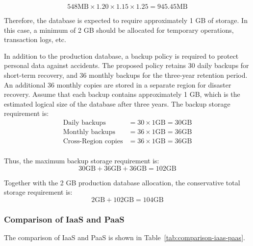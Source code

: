 \[
	548 \text{MB} \times 1.20 \times 1.15 \times 1.25 = 945.45 \text{MB}
\]

Therefore, the database is expected to require approximately 1 GB of storage. In this case, a minimum of 2 GB should be allocated for temporary operations, transaction logs, etc.

In addition to the production database, a backup policy is required to protect personal data against accidents. The proposed policy retains 30 daily backups for short-term recovery, and 36 monthly backups for the three-year retention period. An additional 36 monthly copies are stored in a separate region for disaster recovery. Assume that each backup contains approximately 1 GB, which is the estimated logical size of the database after three years. The backup storage requirement is:
\begin{align*}
	\text{Daily backups}       & = 30 \times 1 \text{GB} = 30 \text{GB} \\
	\text{Monthly backups}     & = 36 \times 1 \text{GB} = 36 \text{GB} \\
	\text{Cross-Region copies} & = 36 \times 1 \text{GB} = 36 \text{GB} \\
\end{align*}

Thus, the maximum backup storage requirement is:
\[
	30 \text{GB} + 36 \text{GB} + 36 \text{GB} = 102 \text{GB}
\]

Together with the 2 GB production database allocation, the conservative total storage requirement is:
\[
	2 \text{GB} + 102 \text{GB} = 104 \text{GB}
\]

\subsubsection{Comparison of IaaS and PaaS}

The comparison of IaaS and PaaS	is shown in Table~\ref{tab:comparison-iaas-paas}.

